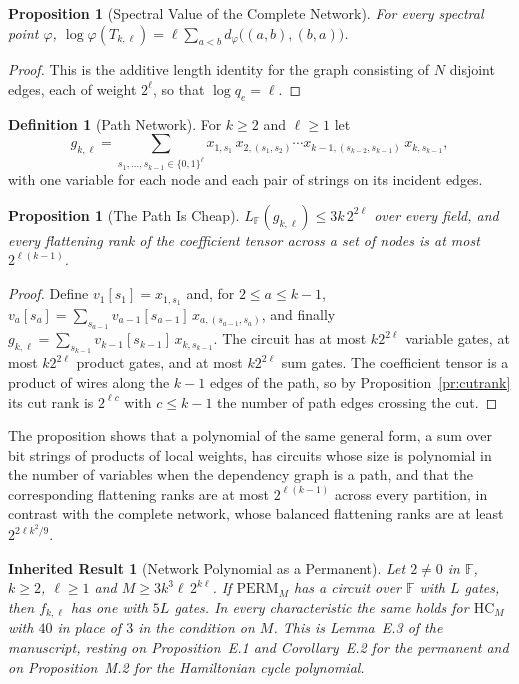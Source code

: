 \documentclass[11pt,letterpaper]{report}
\theoremstyle{plain}
\newtheorem{proposition}[theorem]{Proposition}
\newtheorem{inherited}[theorem]{Inherited Result}
\theoremstyle{definition}
\newtheorem{definition}[theorem]{Definition}
\theoremstyle{remark}
\begin{document}
\begin{proposition}[Spectral Value of the Complete Network]
For every spectral point $\varphi$, $\log\varphi(T_{k,\ell})=\ell\sum_{a<b}d_\varphi\bigl((a,b),(b,a)\bigr)$.
\end{proposition}
\begin{proof}
This is the additive length identity for the graph consisting of $N$ disjoint edges, each of weight $2^{\ell}$, so that $\log q_e=\ell$.
\end{proof}

\begin{definition}[Path Network]
For $k\ge2$ and $\ell\ge1$ let
\[
g_{k,\ell}=\sum_{s_1,\ldots,s_{k-1}\in\{0,1\}^{\ell}}x_{1,s_1}\,x_{2,(s_1,s_2)}\cdots x_{k-1,(s_{k-2},s_{k-1})}\,x_{k,s_{k-1}},
\]
with one variable for each node and each pair of strings on its incident edges.
\end{definition}

\begin{proposition}[The Path Is Cheap]\label{pr:path}
$L_{\mathbb F}(g_{k,\ell})\le3k\,2^{2\ell}$ over every field, and every flattening rank of the coefficient tensor across a set of nodes is at most $2^{\ell(k-1)}$.
\end{proposition}
\begin{proof}
Define $v_1[s_1]=x_{1,s_1}$ and, for $2\le a\le k-1$, $v_a[s_a]=\sum_{s_{a-1}}v_{a-1}[s_{a-1}]\,x_{a,(s_{a-1},s_a)}$, and finally $g_{k,\ell}=\sum_{s_{k-1}}v_{k-1}[s_{k-1}]\,x_{k,s_{k-1}}$. The circuit has at most $k2^{2\ell}$ variable gates, at most $k2^{2\ell}$ product gates, and at most $k2^{2\ell}$ sum gates. The coefficient tensor is a product of wires along the $k-1$ edges of the path, so by Proposition~\ref{pr:cutrank} its cut rank is $2^{\ell c}$ with $c\le k-1$ the number of path edges crossing the cut.
\end{proof}

The proposition shows that a polynomial of the same general form, a sum over bit strings of products of local weights, has circuits whose size is polynomial in the number of variables when the dependency graph is a path, and that the corresponding flattening ranks are at most $2^{\ell(k-1)}$ across every partition, in contrast with the complete network, whose balanced flattening ranks are at least $2^{2\ell k^2/9}$.

\begin{inherited}[Network Polynomial as a Permanent]\label{inh:netperm}
Let $2\ne0$ in $\mathbb F$, $k\ge2$, $\ell\ge1$ and $M\ge3k^3\ell\,2^{k\ell}$. If $\mathrm{PERM}_M$ has a circuit over $\mathbb F$ with $L$ gates, then $f_{k,\ell}$ has one with $5L$ gates. In every characteristic the same holds for $\mathrm{HC}_M$ with $40$ in place of $3$ in the condition on $M$. This is Lemma~E.3 of the manuscript, resting on Proposition~E.1 and Corollary~E.2 for the permanent and on Proposition~M.2 for the Hamiltonian cycle polynomial.
\end{inherited}
\end{document}
